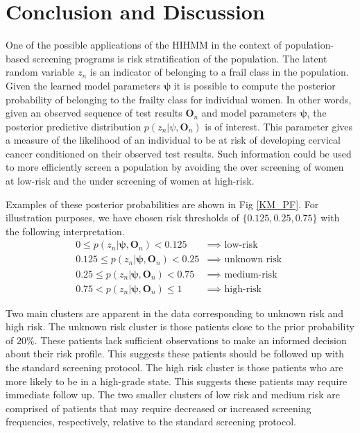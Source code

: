 \documentclass{article}
\begin{document}
\section{Conclusion and Discussion}
One of the possible applications of the HIHMM in the context of population-based screening programs is risk stratification of the population.  The latent random variable $z_n$ is an indicator of belonging to a frail class in the population.  Given the learned model parameters $\bm \psi$  it is possible to compute the posterior probability of belonging to the frailty class for individual women.  In other words, given an observed sequence of test results ${\bm O}_n$ and model parameters  $\bm \psi$,  the posterior predictive distribution $p(z_n | \psi, {\bm O}_n)$ is of interest.  This parameter gives a measure of the likelihood of an individual to be at risk of developing cervical cancer conditioned on their observed test results. Such information could be used to more efficiently screen a population by avoiding the over screening of women at low-risk and the under screening of women at high-risk.  


Examples of these posterior probabilities are shown in Fig \ref{KM_PF}. For illustration purposes, we have chosen risk thresholds of $\{0.125,0.25, 0.75\}$ with the following interpretation.
\begin{align*}
0 \leq p(z_n | \bm \psi, {\bm O}_n) < 0.125 &\implies \text{ low-risk  } \\
0.125 \leq p(z_n | \bm \psi, {\bm O}_n)  < 0.25 &\implies \text{ unknown risk  }\\
0.25 \leq p(z_n | \bm \psi, {\bm O}_n)  < 0.75      &\implies \text{ medium-risk }\\
0.75 <  p(z_n | \bm \psi, {\bm O}_n) \leq 1 &\implies \text{ high-risk } 
\end{align*}

Two main clusters are apparent in the data corresponding to unknown risk and high risk. The unknown risk cluster is those patients close to the prior probability of $20\%$.  These patients lack sufficient observations to make an informed decision about their risk profile.  This suggests these patients should be followed up with the standard screening protocol.  The high risk cluster is those patients who are more likely to be in a high-grade state.  This suggests these patients may require immediate follow up.  The two smaller clusters of low risk and medium risk are comprised of patients that may require decreased or increased screening frequencies, respectively, relative to the standard screening protocol. 
\end{document}
